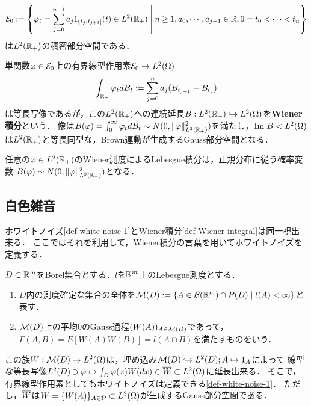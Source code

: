 \documentclass[uplatex,dvipdfmx]{jsreport}
\begin{document}
\begin{notation}
    \[\mathcal{E}_0:=\left\{\varphi_t=\sum^{n-1}_{j=0}a_j1_{(t_j,t_{j+1}]}(t)\in L^2(\mathbb{R}_+)\;\middle|\;n\ge 1,a_0,\cdots,a_{j-1}\in\mathbb{R},0=t_0<\cdots<t_n\right\}\]
    は$L^2(\mathbb{R}_+)$の稠密部分空間である．
\end{notation}

\begin{definition}\label{def-Wiener-integral}
    単関数$\varphi\in\mathcal{E}_0$上の有界線型作用素$\mathcal{E}_0\to L^2(\Omega)$
    \[\int_{\mathbb{R}_+}\varphi_tdB_t:=\sum^n_{j=0}a_j(B_{t_{j+1}}-B_{t_j})\]
    は等長写像であるが，この$L^2(\mathbb{R}_+)$への連続延長$B:L^2(\mathbb{R}_+)\hookrightarrow L^2(\Omega)$を\textbf{Wiener積分}という．
    像は$B(\varphi)=\int^\infty_0\varphi_tdB_t\sim N(0,\|\varphi\|^2_{L^2(\mathbb{R}_+)})$を満たし，$\mathrm{Im}\; B<L^2(\Omega)$は$L^2(\mathbb{R}_+)$と等長同型な，Brown運動が生成するGauss部分空間となる．
\end{definition}

\begin{lemma}
    任意の$\varphi\in L^2(\mathbb{R}_+)$のWiener測度によるLebesgue積分は，正規分布に従う確率変数
    $B(\varphi)\sim N(0,\|\varphi\|^2_{L^2(\mathbb{R}_+)})$となる．
\end{lemma}

\subsection{白色雑音}

\begin{tcolorbox}[colframe=ForestGreen, colback=ForestGreen!10!white,breakable,colbacktitle=ForestGreen!40!white,coltitle=black,fonttitle=\bfseries\sffamily,
title=]
    ホワイトノイズ\ref{def-white-noise-1}とWiener積分\ref{def-Wiener-integral}は同一視出来る．
    ここではそれを利用して，Wiener積分の言葉を用いてホワイトノイズを定義する．
\end{tcolorbox}

\begin{definition}
    $D\subset\mathbb{R}^m$をBorel集合とする．$l$を$\mathbb{R}^m$上のLebesgue測度とする．
    \begin{enumerate}
        \item $D$内の測度確定な集合の全体を$\mathcal{M}(D):=\left\{A\in\mathcal{B}(\mathbb{R}^m)\cap P(D)\mid l(A)<\infty\right\}$と表す．
        \item $\mathcal{M}(D)$上の平均$0$のGauss過程$(W(A))_{A\in\mathcal{M}(D)}$であって，$\Gamma(A,B)=E[W(A)W(B)]=l(A\cap B)$を満たすものをいう．
    \end{enumerate}
\end{definition}
\begin{remarks}
    この族$W:\mathcal{M}(D)\to L^2(\Omega)$は，埋め込み$\mathcal{M}(D)\hookrightarrow L^2(D);A\mapsto 1_A$によって
    線型な等長写像$L^2(D)\ni\varphi\mapsto\int_D\varphi(x)W(dx)\in\overline{W}\subset L^2(\Omega)$に延長出来る．
    そこで，有界線型作用素としてもホワイトノイズは定義できる\ref{def-white-noise-1}．
    ただし，$\overline{W}$は$W=\{W(A)\}_{A\in\mathcal{D}}\subset L^2(\Omega)$が生成するGauss部分空間である．
\end{remarks}
\end{document}
